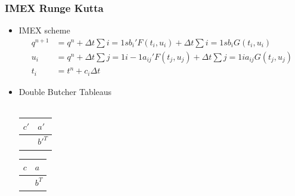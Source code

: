 \documentclass[10pt]{beamer}
\begin{document}
    \begin{frame}
      \frametitle{IMEX Runge Kutta}
      \begin{itemize}
        \item IMEX scheme
          \begin{align*}
            q^{n+1} &= q^n + \Delta t \sum{i = 1}{s}{b_i' F(t_i, u_i)} + \Delta t \sum{i=1}{s}{b_i G(t_i, u_i)} \\
            u_i &= q^n + \Delta t \sum{j = 1}{i-1}{a_{ij}' F(t_j, u_j)} + \Delta t \sum{j=1}{i}{a_{ij} G(t_j, u_j)} \\
            t_i &= t^n + c_i \Delta t
          \end{align*}

        \item Double Butcher Tableaus \hfill \\ \hfill \\
          \begin{tabular}{r|l}
            $c'$ & $a'$ \\
            \midrule
               & $b'^T$
          \end{tabular}
          \begin{tabular}{r|l}
            $c$ & $a$ \\
            \midrule
               & $b^T$
          \end{tabular}
      \end{itemize}
    \end{frame}
\end{document}
